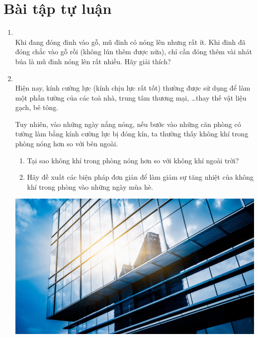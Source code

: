 \section{Bài tập tự luận}
\begin{enumerate}[label=\bfseries Câu \arabic*:, leftmargin=1.7cm]
	\item {}\\
	Khi đang đóng đinh vào gỗ, mũ đinh có nóng lên nhưng rất ít. Khi đinh đã đóng chắc vào gỗ rồi (không lún thêm được nữa), chỉ cần đóng thêm vài nhát búa là mũ đinh nóng lên rất nhiều. Hãy giải thích?

\item {}\\
Hiện nay, kính cường lực (kính chịu lực rất tốt) thường được sử dụng để làm một phần tường của các toà nhà, trung tâm thương mại, \dots thay thế vật liệu gạch, bê tông. \\
\begin{minipage}{0.6\textwidth}
	Tuy nhiên, vào những ngày nắng nóng, nếu bước vào những căn phòng có tường làm bằng kính cường lực bị đóng kín, ta thường thấy không khí trong phòng nóng hơn so với bên ngoài.
	\begin{enumerate}[label=\alph*)]
		\item Tại sao không khí trong phòng nóng hơn so với không khí ngoài trời?
		\item Hãy đề xuất các biện pháp đơn giản để làm giảm sự tăng nhiệt của không khí trong phòng vào những ngày mùa hè.
	\end{enumerate}
\end{minipage}\hfill
\begin{minipage}{0.4\textwidth}
	\begin{center}
		\includegraphics[width=0.7\linewidth]{../figs/VN12-Y24-PH-SYL-003P-1}

\end{center}
\end{minipage}
\end{enumerate}
